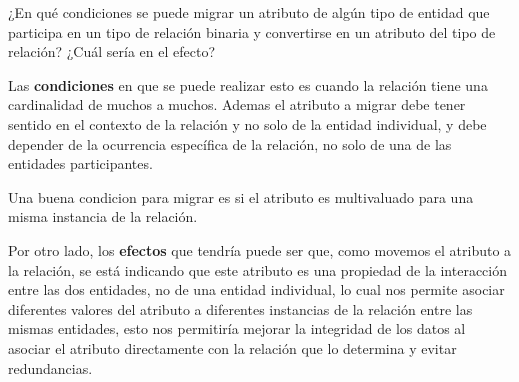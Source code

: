 ¿En qué condiciones se puede migrar un atributo de algún tipo de entidad que participa en un tipo de relación binaria y convertirse en un atributo del tipo de relación? ¿Cuál sería en el efecto?

   Las \textbf{condiciones} en que se puede realizar esto es cuando la relación tiene una cardinalidad de muchos a muchos. Ademas el atributo a migrar debe tener sentido en el contexto de la relación y no solo de la entidad individual, y debe depender de la ocurrencia específica de la relación, no solo de una de las entidades participantes. 
   
   Una buena condicion para migrar es si el atributo es multivaluado para una misma instancia de la relación.

   Por otro lado, los \textbf{efectos} que tendría puede ser que, como movemos el atributo a la relación, se está indicando que este atributo es una propiedad de la interacción entre las dos entidades, no de una entidad individual, lo cual nos permite asociar diferentes valores del atributo a diferentes instancias de la relación entre las mismas entidades, esto nos permitiría mejorar la integridad de los datos al asociar el atributo directamente con la relación que lo determina y evitar redundancias. \\